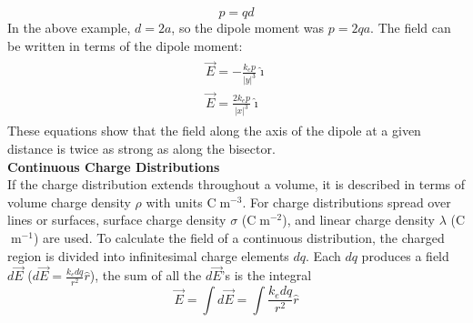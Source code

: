 \documentclass[a4paper]{article}
\let\bf\textbf
\newcommand{\ih}{\hat{\imath}}
\begin{document}
\begin{equation}
    p = qd
\end{equation}
In the above example, $d = 2a$, so the dipole moment was $p = 2qa$. The field can be written in terms of the dipole moment:
\begin{align}
    \begin{split}
        \vec{E} = -\frac{k_ep}{|y|^3}\ih \\
        \vec{E} = \frac{2k_ep}{|x|^3}\ih 
    \end{split}
\end{align}
These equations show that the field along the axis of the dipole at a given distance is twice as strong as along the bisector. 
\vspace{1mm} \\

\noindent\bf{Continuous Charge Distributions}
\vspace{1mm}\\
If the charge distribution extends throughout a volume, it is described in terms of volume charge density $\rho$ with units C$\;$m$^{-3}$. For charge distributions spread over lines or surfaces, surface charge density $\sigma$ (C$\;$m$^{-2}$), and linear charge density $\lambda$ (C$\;$m$^{-1}$) are used. To calculate the field of a continuous distribution, the charged region is divided into infinitesimal charge elements $dq$. Each $dq$ produces a field $d\vec{E}$ ($d\vec{E} = \frac{k_edq}{r^2}\hat{r}$), the sum of all the $d\vec{E}$'s is the integral
\begin{equation}
    \vec{E} = \int d\vec{E} = \int \frac{k_edq}{r^2}\hat{r}
\end{equation}
\end{document}
